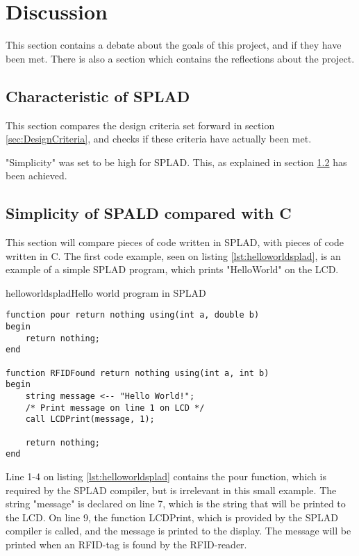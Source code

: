 \section{Discussion}
\label{sec:discussion}
This section contains a debate about the goals of this project, and if they have been met. There is also a section which contains the reflections about the project.

\subsection{Characteristic of SPLAD}
This section compares the design criteria set forward in section \ref{sec:DesignCriteria}, and checks if these criteria have actually been met.

"Simplicity" was set to be high for SPLAD. This, as explained in section \ref{sec:simplespladc} has been achieved. 

\subsection{Simplicity of SPALD compared with C}
\label{sec:simplespladc}
This section will compare pieces of code written in SPLAD, with pieces of code written in C. The first code example, seen on listing \ref{lst:helloworldsplad}, is an example of a simple SPLAD program, which prints "HelloWorld" on the LCD.

\begin{code}{helloworldsplad}{Hello world program in SPLAD}
\begin{lstlisting}
function pour return nothing using(int a, double b)
begin
	return nothing;
end

function RFIDFound return nothing using(int a, int b)
begin
	string message <-- "Hello World!";
	/* Print message on line 1 on LCD */
	call LCDPrint(message, 1);

	return nothing;
end
\end{lstlisting}
\end{code}

Line 1-4 on listing \ref{lst:helloworldsplad} contains the pour function, which is required by the SPLAD compiler, but is irrelevant in this small example. The string "message" is declared on line 7, which is the string that will be printed to the LCD. On line 9, the function LCDPrint, which is provided by the SPLAD compiler is called, and the message is printed to the display. The message will be printed when an RFID-tag is found by the RFID-reader.

